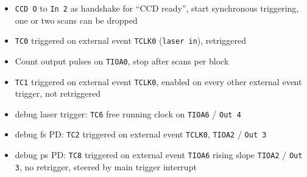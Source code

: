 \documentclass[a4paper,12pt]{article}
\begin{document}
\begin{itemize}
\item \texttt{CCD O} to \texttt{In 2} as handshake for ``CCD ready'', start synchronous
  triggering, one or two scans can be dropped
\item
\texttt{TC0} triggered on external event \texttt{TCLK0} (\texttt{laser in}), retriggered
\item Count output pulses on \texttt{TIOA0}, stop after scans per block
\item
\texttt{TC1} triggered on external event \texttt{TCLK0}, enabled on every other external
  event trigger, not retriggered
\item debug laser trigger: \texttt{TC6} free running clock on
  \texttt{TIOA6} / \texttt{Out 4}
\item debug fs PD: \texttt{TC2} triggered on external event \texttt{TCLK0},
  \texttt{TIOA2} / \texttt{Out 3}
\item debug ps PD: \texttt{TC8} triggered on external event \texttt{TIOA6} rising slope
  \texttt{TIOA2} / \texttt{Out 3}, no retrigger, steered by main trigger interrupt
\end{itemize}
\end{document}
